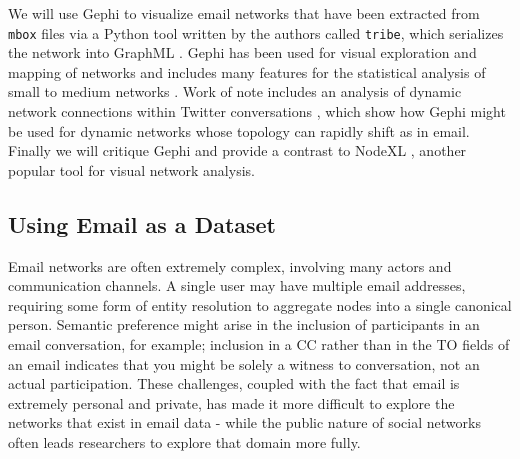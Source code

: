 \documentclass[11pt,letterpaper]{article}
\begin{document}
We will use Gephi \cite{gephi_gephi-open_2010} to visualize email networks that have been extracted from \texttt{mbox} files via a Python tool written by the authors called \texttt{tribe}, which serializes the network into GraphML \cite{brandes_graph_2010}. Gephi has been used for visual exploration and mapping of networks \cite{bastian_gephi:_2009} and includes many features for the statistical analysis of small to medium networks \cite{mcsweeney_gephi_2009}. Work of note includes an analysis of dynamic network connections within Twitter conversations \cite{bruns_how_2012}, which show how Gephi might be used for dynamic networks whose topology can rapidly shift as in email. Finally we will critique Gephi and provide a contrast to NodeXL \cite{smith_nodexl:_2010}, another popular tool for visual network analysis.

\subsection*{Using Email as a Dataset}

Email networks are often extremely complex, involving many actors and communication channels. A single user may have multiple email addresses, requiring some form of entity resolution to aggregate nodes into a single canonical person. Semantic preference might arise in the inclusion of participants in an email conversation, for example; inclusion in a CC rather than in the TO fields of an email indicates that you might be solely a witness to conversation, not an actual participation. These challenges, coupled with the fact that email is extremely personal and private, has made it more difficult to explore the networks that exist in email data - while the public nature of social networks often leads researchers to explore that domain more fully.
\end{document}
